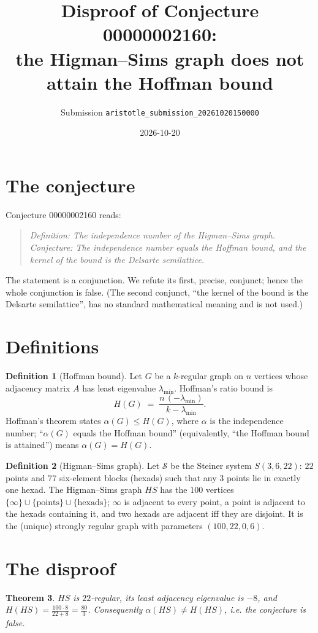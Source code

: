 \documentclass[11pt]{article}
\title{Disproof of Conjecture 00000002160:\\ the Higman--Sims graph does not attain the Hoffman bound}
\author{Submission \texttt{aristotle\_submission\_20261020150000}}
\date{2026-10-20}
\newtheorem{theorem}{Theorem}
\theoremstyle{definition}
\newtheorem{definition}[theorem]{Definition}
\theoremstyle{remark}
\begin{document}
\maketitle

\section{The conjecture}
Conjecture 00000002160 reads:
\begin{quote}
\emph{Definition: The independence number of the Higman--Sims graph. Conjecture: The
independence number equals the Hoffman bound, and the kernel of the bound is the Delsarte
semilattice.}
\end{quote}
The statement is a conjunction. We refute its first, precise, conjunct; hence the whole
conjunction is false. (The second conjunct, ``the kernel of the bound is the Delsarte
semilattice'', has no standard mathematical meaning and is not used.)

\section{Definitions}
\begin{definition}[Hoffman bound]
Let $G$ be a $k$-regular graph on $n$ vertices whose adjacency matrix $A$ has least eigenvalue
$\lambda_{\min}$. Hoffman's ratio bound is
\[ H(G) \;=\; \frac{n\,(-\lambda_{\min})}{k-\lambda_{\min}} . \]
Hoffman's theorem states $\alpha(G)\le H(G)$, where $\alpha$ is the independence number;
``$\alpha(G)$ equals the Hoffman bound'' (equivalently, ``the Hoffman bound is attained'')
means $\alpha(G)=H(G)$.
\end{definition}

\begin{definition}[Higman--Sims graph]
Let $\mathcal{S}$ be the Steiner system $S(3,6,22)$: $22$ points and $77$ six-element blocks
(hexads) such that any $3$ points lie in exactly one hexad. The Higman--Sims graph $HS$ has
the $100$ vertices $\{\infty\}\cup\{\text{points}\}\cup\{\text{hexads}\}$; $\infty$ is adjacent to
every point, a point is adjacent to the hexads containing it, and two hexads are adjacent iff
they are disjoint. It is the (unique) strongly regular graph with parameters
$(100,22,0,6)$.
\end{definition}

\section{The disproof}
\begin{theorem}\label{thm:main}
$HS$ is $22$-regular, its least adjacency eigenvalue is $-8$, and
$H(HS) = \frac{100\cdot 8}{22+8} = \frac{80}{3}$. Consequently $\alpha(HS)\neq H(HS)$, i.e.
the conjecture is false.
\end{theorem}
\end{document}
